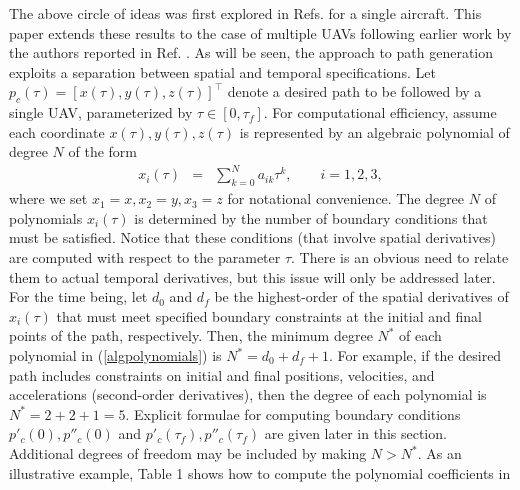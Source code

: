 \documentclass[]{aiaa-tc}%
\begin{document}


The above circle of ideas was first explored in Refs.
\cite{Neljubov, Taranenko, Taranenko-Momdgi, Yakimenko} for a
single aircraft. This paper extends these results to the case of
multiple UAVs following earlier work by the authors reported in
Ref. \cite{isaac_acc_06}. As will be seen, the approach to path
generation exploits a separation between spatial and temporal
specifications. Let $p_c(\tau) = [x(\tau), y(\tau),
z(\tau)]^{\top}$ denote a desired path to be followed by a single
UAV, parameterized by $\tau \in [0, \tau_f]$. For computational
efficiency, assume each coordinate $x (\tau), y(\tau), z(\tau)$ is
represented by an algebraic polynomial of degree $N$ of the form
\begin{eqnarray} \label{algpolynomials} x_{i}(\tau) &=& \sum_{k =
0}^{N} a_{ik} \tau^k, \qquad i = 1,2,3, \end{eqnarray} where we
set $x_{1} = x, x_{2} = y, x_{3} = z$ for notational convenience.
The degree $N$ of polynomials $x_{i}(\tau)$ is determined by the
number of boundary conditions that must be satisfied. Notice that
these conditions (that involve spatial derivatives) are computed
with respect to the parameter $\tau$. There is an obvious need to
relate them to actual temporal derivatives, but this issue will
only be addressed later. For the time being, let $d_0$ and $d_f$
be the highest-order of the spatial derivatives of $x_{i}(\tau)$
that must meet specified boundary constraints at the initial and
final points of the path, respectively. Then, the minimum degree
$N^*$ of each polynomial in (\ref{algpolynomials}) is $N^{*} = d_0
+ d_f + 1$. For example, if the desired path includes constraints
on initial and final positions, velocities, and accelerations
(second-order derivatives), then the degree of each polynomial is
$N^{*} = 2 + 2 + 1 = 5$. Explicit formulae for computing boundary
conditions $p'_c(0), p''_c(0)$ and $p'_c(\tau_f), p''_c(\tau_f)$
are given later in this section.  Additional degrees of freedom
may be included by making $N > N^*$. As an illustrative example,
Table 1 shows how to compute the polynomial coefficients in
\end{document}
